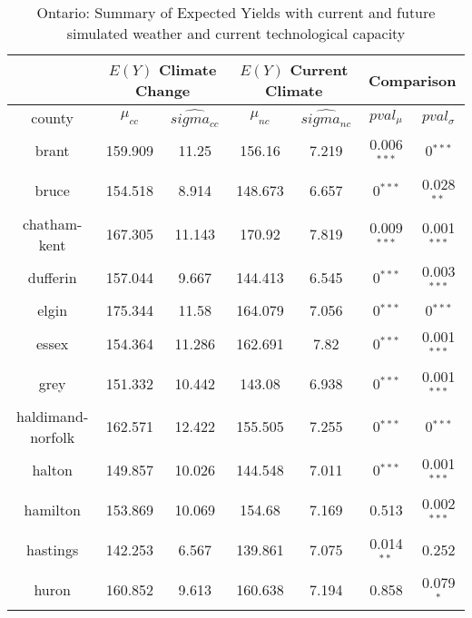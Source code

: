 \begin{table}[]
\caption{Ontario: Summary of Expected Yields with current and future simulated weather and current technological capacity}
\label{my-label}
\begin{tabular}{|c|cc|cc|cc|}
\hline
\multicolumn{1}{|c}{} & \multicolumn{2}{|c}{$E(Y)$ Climate Change} & \multicolumn{2}{|c}{$E(Y)$ Current Climate} & \multicolumn{2}{|c|}{Comparison}\\ 
\hline
county        & $\mu_{cc}$ & $\hat{sigma_{cc}}$ & $\mu_{nc}$ & $\hat{sigma_{nc}}$ & $pval_{\mu}$ & $pval_{\sigma}$ \\
\hline

brant                     & 159.909   & 11.25             & 156.16    & 7.219             & 0.006$^{***}$ & 0$^{***}$     \\
bruce                     & 154.518   & 8.914             & 148.673   & 6.657             & 0$^{***}$     & 0.028$^{**}$  \\
chatham-kent              & 167.305   & 11.143            & 170.92    & 7.819             & 0.009$^{***}$ & 0.001$^{***}$ \\
dufferin                  & 157.044   & 9.667             & 144.413   & 6.545             & 0$^{***}$     & 0.003$^{***}$ \\
elgin                     & 175.344   & 11.58             & 164.079   & 7.056             & 0$^{***}$     & 0$^{***}$     \\
essex                     & 154.364   & 11.286            & 162.691   & 7.82              & 0$^{***}$     & 0.001$^{***}$ \\
grey                      & 151.332   & 10.442            & 143.08    & 6.938             & 0$^{***}$     & 0.001$^{***}$ \\
haldimand-norfolk         & 162.571   & 12.422            & 155.505   & 7.255             & 0$^{***}$     & 0$^{***}$     \\
halton                    & 149.857   & 10.026            & 144.548   & 7.011             & 0$^{***}$     & 0.001$^{***}$ \\
hamilton                  & 153.869   & 10.069            & 154.68    & 7.169             & 0.513                         & 0.002$^{***}$ \\
hastings                  & 142.253   & 6.567             & 139.861   & 7.075             & 0.014$^{**}$  & 0.252                         \\
huron                     & 160.852   & 9.613             & 160.638   & 7.194             & 0.858                         & 0.079$^{*}$   \\

\end{tabular}
\end{table}
